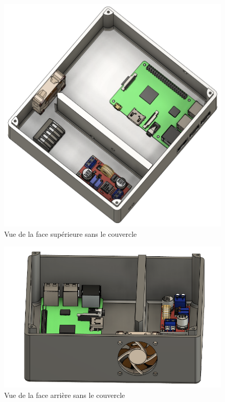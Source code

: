 \begin{figure}[ht!]
  \centering
  \includegraphics[scale=0.4]{img/el_prototype/box2}
  \caption{Vue de la face supérieure sans le couvercle}
  \label{fig:box2}
\end{figure}

\begin{figure}[ht!]
  \centering
  \includegraphics[scale=0.4]{img/el_prototype/box3}
  \caption{Vue de la face arrière sans le couvercle}
  \label{fig:box3}
\end{figure}

